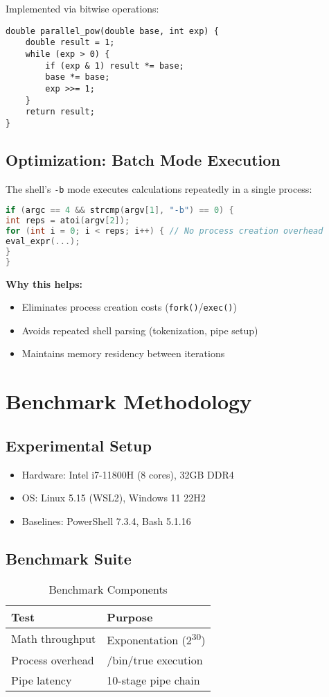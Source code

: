 \documentclass[10pt,twocolumn]{article}
\begin{document}
Implemented via bitwise operations:

\begin{lstlisting}[caption={Exponentiation by Squaring},xleftmargin=2em]
double parallel_pow(double base, int exp) {
    double result = 1;
    while (exp > 0) {
        if (exp & 1) result *= base;
        base *= base;
        exp >>= 1;
    }
    return result;
}
\end{lstlisting}
\subsection{Optimization: Batch Mode Execution}
The shell's \texttt{-b} mode executes calculations repeatedly in a single process:

\begin{lstlisting}[language=C,caption={Batch Execution Without Process Overhead},xleftmargin=2em]
if (argc == 4 && strcmp(argv[1], "-b") == 0) {
int reps = atoi(argv[2]);
for (int i = 0; i < reps; i++) { // No process creation overhead
eval_expr(...);
}
}
\end{lstlisting}

\textbf{Why this helps:}
\begin{itemize}
\item Eliminates process creation costs (\texttt{fork()}/\texttt{exec()})
\item Avoids repeated shell parsing (tokenization, pipe setup)
\item Maintains memory residency between iterations
\end{itemize}

\section{Benchmark Methodology}

\subsection{Experimental Setup}
\begin{itemize}
\item Hardware: Intel i7-11800H (8 cores), 32GB DDR4
\item OS: Linux 5.15 (WSL2), Windows 11 22H2
\item Baselines: PowerShell 7.3.4, Bash 5.1.16
\end{itemize}

\subsection{Benchmark Suite}
\begin{table}[ht]
\centering
\caption{Benchmark Components}
\label{tab:benchmarks}
\begin{tabular}{@{}ll@{}}
\toprule
\textbf{Test} & \textbf{Purpose} \\
\midrule
Math throughput & Exponentation (2\textsuperscript{30}) \\
Process overhead & /bin/true execution \\
Pipe latency & 10-stage pipe chain \\
\bottomrule
\end{tabular}
\end{table}
\end{document}
